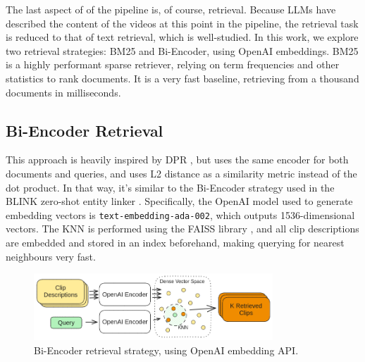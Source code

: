 The last aspect of of the pipeline is, of course, retrieval.
Because LLMs have described the content of the videos at this point in the pipeline, the retrieval task is reduced to that of text retrieval, which is well-studied.
In this work, we explore two retrieval strategies: BM25 and Bi-Encoder, using OpenAI embeddings.
BM25 is a highly performant sparse retriever, relying on term frequencies and other statistics to rank documents.
It is a very fast baseline, retrieving from a thousand documents in milliseconds.

\subsection{Bi-Encoder Retrieval}
This approach is heavily inspired by DPR \cite{dpr}, but uses the same encoder for both documents and queries, and uses L2 distance as a similarity metric instead of the dot product.
In that way, it's similar to the Bi-Encoder strategy used in the BLINK zero-shot entity linker \cite{blink}.
Specifically, the OpenAI model used to generate embedding vectors is \verb|text-embedding-ada-002|, which outputs 1536-dimensional vectors.
The KNN is performed using the FAISS library \cite{faiss}, and all clip descriptions are embedded and stored in an index beforehand, making querying for nearest neighbours very fast.

\begin{figure}
      \centering
      \includegraphics[width=0.8\textwidth]{figures/openai_DPR.png}
      \caption{Bi-Encoder retrieval strategy, using OpenAI embedding API.}
      \label{fig:bienc}
\end{figure}

